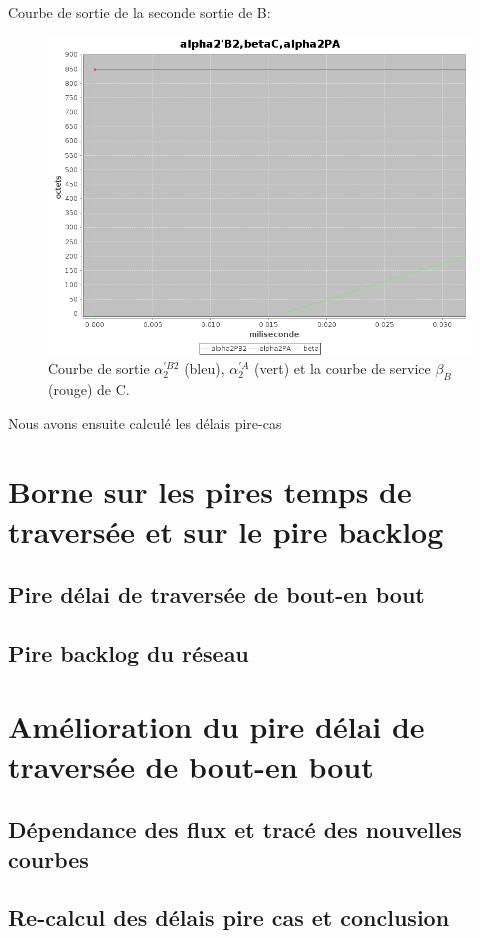 Courbe de sortie de la seconde sortie de B: 
\begin{figure}[!ht]%
\centering%
\noindent\includegraphics[width = .4\textwidth]{./II/images/alpha2PB2.png}%
\caption{\label{fig:alpha2PB2}Courbe de sortie $\alpha_2^{'B2}$ (bleu), $\alpha_2^{'A}$ (vert) et la courbe de service $\beta_B$ (rouge) de C.}%
\end{figure} 
Nous avons ensuite calculé les délais pire-cas 




\section{Borne sur les pires temps de traversée et sur le pire backlog}

\subsection{Pire délai de traversée de bout-en bout}

\subsection{Pire backlog du réseau}

\section{Amélioration du pire délai de traversée de bout-en bout}
\subsection{Dépendance des flux et tracé des nouvelles courbes}
\subsection{Re-calcul des délais pire cas et conclusion}